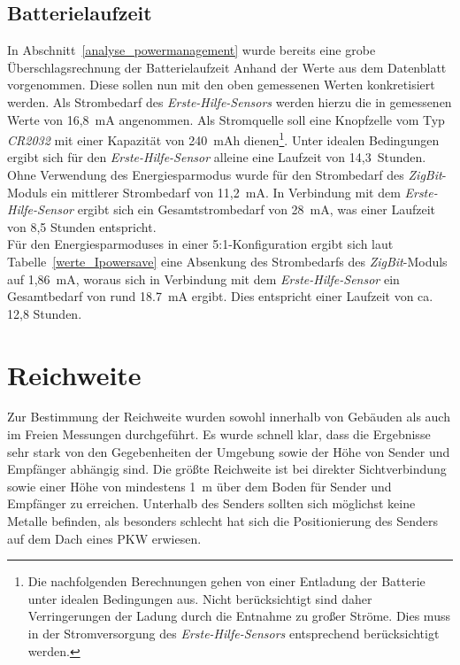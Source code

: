 \subsection{Batterielaufzeit}
In Abschnitt~\ref{analyse_powermanagement} wurde bereits eine grobe Überschlagsrechnung der Batterielaufzeit
Anhand der Werte aus dem Datenblatt vorgenommen. Diese sollen nun mit den oben gemessenen Werten konkretisiert
werden. Als Strombedarf des \emph{Erste-Hilfe-Sensors} werden hierzu die in \cite{Marco} gemessenen Werte von
16,8~mA angenommen. Als Stromquelle soll eine Knopfzelle vom Typ \emph{CR2032} mit einer Kapazität von 240~mAh 
dienen\footnote{Die nachfolgenden Berechnungen gehen von einer Entladung der Batterie unter idealen Bedingungen aus. 
Nicht berücksichtigt sind daher Verringerungen der Ladung durch die Entnahme zu großer Ströme. Dies muss in der
Stromversorgung des \emph{Erste-Hilfe-Sensors} entsprechend berücksichtigt werden.}. Unter 
idealen Bedingungen ergibt sich für den \emph{Erste-Hilfe-Sensor} alleine eine Laufzeit von 14,3~Stunden.\\
Ohne Verwendung des Energiesparmodus wurde für den Strombedarf des \emph{ZigBit}-Moduls ein mittlerer Strombedarf von 
11,2~mA. In Verbindung mit dem \emph{Erste-Hilfe-Sensor} ergibt sich ein Gesamtstrombedarf von 28~mA, was einer
Laufzeit von 8,5 Stunden entspricht.\\
Für den Energiesparmoduses in einer 5:1-Konfiguration ergibt sich laut Tabelle~\ref{werte_Ipowersave} eine Absenkung
des Strombedarfs des \emph{ZigBit}-Moduls auf 1,86~mA, woraus sich in Verbindung mit dem \emph{Erste-Hilfe-Sensor}
ein Gesamtbedarf von rund 18.7~mA ergibt. Dies entspricht einer Laufzeit von ca. 12,8 Stunden.\\

\section{Reichweite}
Zur Bestimmung der Reichweite wurden sowohl innerhalb von Gebäuden als auch im Freien Messungen durchgeführt. 
Es wurde schnell klar, dass die Ergebnisse sehr stark von den Gegebenheiten der Umgebung sowie der Höhe von
Sender und Empfänger abhängig sind. Die größte Reichweite ist bei direkter Sichtverbindung
sowie einer Höhe von mindestens 1~m über dem Boden für Sender und Empfänger zu erreichen. 
Unterhalb des Senders sollten sich möglichst keine Metalle befinden, als besonders schlecht hat sich die 
Positionierung des Senders auf dem Dach eines PKW erwiesen. 

